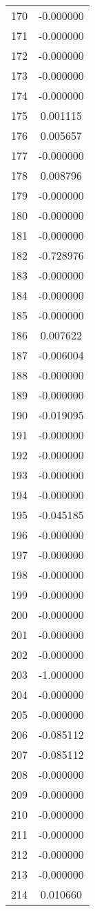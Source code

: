 \documentclass[12pt]{article}
\begin{document}
\begin{longtable}{@{}cc@{}}
170 & -0.000000 \\
171 & -0.000000 \\
172 & -0.000000 \\
173 & -0.000000 \\
174 & -0.000000 \\
175 & 0.001115 \\
176 & 0.005657 \\
177 & -0.000000 \\
178 & 0.008796 \\
179 & -0.000000 \\
180 & -0.000000 \\
181 & -0.000000 \\
182 & -0.728976 \\
183 & -0.000000 \\
184 & -0.000000 \\
185 & -0.000000 \\
186 & 0.007622 \\
187 & -0.006004 \\
188 & -0.000000 \\
189 & -0.000000 \\
190 & -0.019095 \\
191 & -0.000000 \\
192 & -0.000000 \\
193 & -0.000000 \\
194 & -0.000000 \\
195 & -0.045185 \\
196 & -0.000000 \\
197 & -0.000000 \\
198 & -0.000000 \\
199 & -0.000000 \\
200 & -0.000000 \\
201 & -0.000000 \\
202 & -0.000000 \\
203 & -1.000000 \\
204 & -0.000000 \\
205 & -0.000000 \\
206 & -0.085112 \\
207 & -0.085112 \\
208 & -0.000000 \\
209 & -0.000000 \\
210 & -0.000000 \\
211 & -0.000000 \\
212 & -0.000000 \\
213 & -0.000000 \\
214 & 0.010660 \\

\end{longtable}
\end{document}
